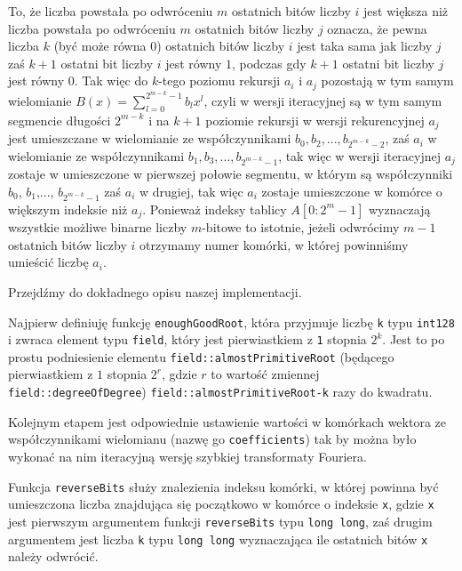 \documentclass{article}
\begin{document}
To, że liczba powstała po odwróceniu $m$ ostatnich bitów liczby $i$ jest większa niż liczba powstała po odwróceniu 
$m$ ostatnich bitów liczby $j$ oznacza, że pewna liczba $k$ (być może równa 
$0$) ostatnich bitów liczby $i$ jest taka sama jak liczby $j$ 
zaś $k+1$ ostatni bit liczby $i$ jest równy $1$, podczas gdy $k+1$ ostatni bit liczby $j$
jest równy $0$.
Tak więc do $k$-tego poziomu rekursji $a_i$ i $a_j$ pozostają w tym samym wielomianie $B(x)=
\sum^{2^{m-k}-1}_{l=0} b_lx^l$, czyli w wersji iteracyjnej są w tym samym segmencie 
długości $2^{m-k}$ i na $k+1$ poziomie rekursji w wersji rekurencyjnej $a_j$ jest umieszczane w wielomianie
ze współczynnikami $b_0,b_2,...,b_{2^{m-k}-2}$, zaś $a_i$ w wielomianie ze współczynnikami
$b_1,b_3,...,b_{2^{m-k}-1}$, tak więc w wersji iteracyjnej $a_j$ zostaje w umieszczone w pierwszej połowie 
segmentu, w którym są współczynniki $b_0$, $b_1$,..., $b_{2^{m-k}-1}$ zaś $a_i$ w drugiej, tak więc $a_i$ zostaje umieszczone w komórce o większym indeksie 
niż $a_j$. Ponieważ indeksy tablicy $A[0:2^m-1]$ 
wyznaczają wszystkie możliwe binarne liczby $m$-bitowe to istotnie, jeżeli odwrócimy $m-1$ ostatnich bitów liczby $i$ otrzymamy numer komórki,
w której powinniśmy umieścić liczbę $a_i$.


Przejdźmy do dokładnego opisu naszej implementacji. 

Najpierw definiuję funkcję \texttt{enoughGoodRoot}, która przyjmuje liczbę \texttt{k} typu 
\texttt{\textunderscore \textunderscore int128}
 i zwraca element typu \texttt{field}, który jest pierwiastkiem z \texttt{1} stopnia $2^k$. 
Jest to po prostu podniesienie elementu \texttt{field::almostPrimitiveRoot} (będącego pierwiastkiem z $1$ stopnia $2^{r}$, gdzie $r$
to wartość zmiennej \texttt{field::degreeOfDegree}) \texttt{field::almostPrimitiveRoot-k}
razy do kwadratu.





Kolejnym etapem jest odpowiednie ustawienie wartości w komórkach wektora ze współczynnikami wielomianu 
(nazwę go \texttt{coefficients}) tak by można było wykonać na nim iteracyjną wersję szybkiej transformaty Fouriera. 



Funkcja \texttt{reverseBits} służy znalezienia indeksu komórki, w której powinna być umieszczona 
liczba znajdująca się początkowo w komórce o indeksie \texttt{x}, gdzie \texttt{x} jest pierwszym 
argumentem funkcji \texttt{reverseBits} typu
\texttt{long long}, zaś drugim argumentem jest liczba \texttt{k} 
typu \texttt{long long} wyznaczająca ile ostatnich bitów \texttt{x} należy odwrócić.
\end{document}
